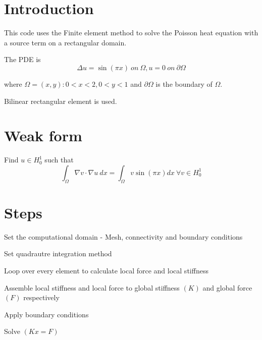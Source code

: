 \hypertarget{index_intro_sec}{}\section{Introduction}\label{index_intro_sec}
This code uses the Finite element method to solve the Poisson heat equation with a source term on a rectangular domain.

The P\+DE is \[ \Delta u = \sin(\pi x)\ on\ \Omega, u = 0\ on\ \partial\Omega \]

where $ \Omega = {(x,y):0<x<2,0<y<1}$ and $\partial\Omega$ is the boundary of $\Omega$.

Bilinear rectangular element is used.\hypertarget{index_install_sec}{}\section{Weak form}\label{index_install_sec}
Find $u\in H_{0}^{1}$ such that \[ \int_{\Omega}\nabla v\cdot\nabla u\ dx=\int_{\Omega}v\sin\left(\pi x\right)dx\ \forall v\in H_{0}^{1} \]\hypertarget{index_steps}{}\section{Steps}\label{index_steps}

\begin{DoxyEnumerate}
\item Set the computational domain -\/ Mesh, connectivity and boundary conditions
\item Set quadrautre integration method
\item Loop over every element to calculate local force and local stiffness
\item Assemble local stiffness and local force to global stiffness $(K)$ and global force $(F)$ respectively
\item Apply boundary conditions
\item Solve $(Kx=F)$ 
\end{DoxyEnumerate}